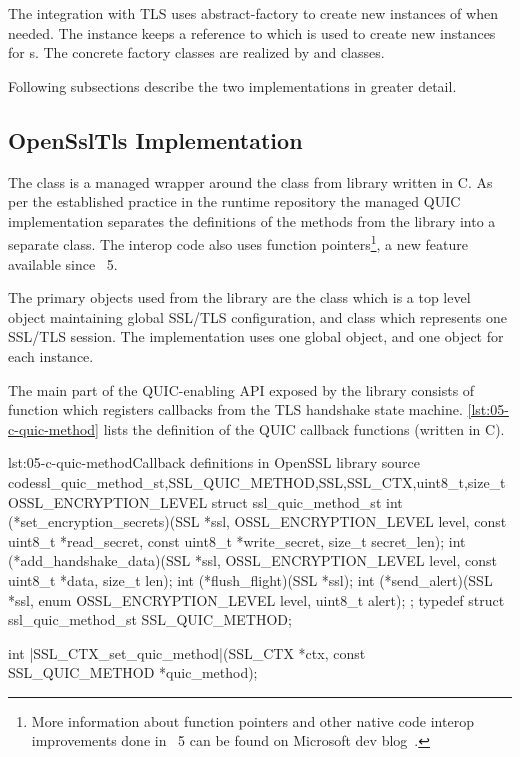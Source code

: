 The integration with TLS uses \gls{abstract-factory} to create new instances of \ITls{} when needed.
The \ManagedQuicImplementationProvider{} instance keeps a reference to \QuicTlsProvider{} which is
used to create new \ITls{} instances for \ManagedQuicConnection{}s. The concrete factory classes are
realized by \OpenSslQuicTlsProvider{} and \MockQuicTlsProvider{} classes.

Following subsections describe the two \ITls{} implementations in greater detail.

\subsection{OpenSslTls Implementation}

The \OpenSslTls{} class is a managed wrapper around the \SSL{} class from \libopenssl{} library
written in C. As per the established practice in the \dotnet{} runtime repository the managed QUIC
implementation separates the definitions of the  methods from the \libopenssl{}
library into a separate  class. The interop code also uses \csharp{}
function pointers\footnote{More information about \csharp{} function pointers and other native code
  interop improvements done in \dotnet{}~5 can be found on Microsoft dev
  blog~\cite{dotnet5interopimprovements}.}, a new feature available since \dotnet{}~5.

The primary objects used from the \libopenssl{} library are the \SSLCTX{} class which is a top level
object maintaining global SSL/TLS configuration, and \SSL{} class which represents one SSL/TLS
session. The \OpenSslTls{} implementation uses one global \SSLCTX{} object, and one \SSL{}
object for each \OpenSslTls{} instance.

The main part of the QUIC-enabling API exposed by the \libopenssl{} library consists of
 function which registers callbacks from the TLS handshake state
machine. \autoref{lst:05-c-quic-method} lists the definition of the \libopenssl{} QUIC callback
functions (written in C).

\begin{myListingC}{lst:05-c-quic-method}{Callback definitions in OpenSSL library source code}{ssl_quic_method_st,SSL_QUIC_METHOD,SSL,SSL_CTX,uint8_t,size_t}{OSSL_ENCRYPTION_LEVEL}
struct ssl_quic_method_st {
    int (*set_encryption_secrets)(SSL *ssl, OSSL_ENCRYPTION_LEVEL level,
                                  const uint8_t *read_secret,
                                  const uint8_t *write_secret,
                                  size_t secret_len);
    int (*add_handshake_data)(SSL *ssl, OSSL_ENCRYPTION_LEVEL level,
                              const uint8_t *data, size_t len);
    int (*flush_flight)(SSL *ssl);
    int (*send_alert)(SSL *ssl, enum OSSL_ENCRYPTION_LEVEL level,
                      uint8_t alert);
};
typedef struct ssl_quic_method_st SSL_QUIC_METHOD;

int |SSL_CTX_set_quic_method|(SSL_CTX *ctx, const SSL_QUIC_METHOD *quic_method);
\end{myListingC}

